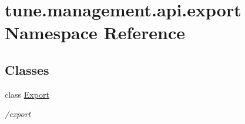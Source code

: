 \hypertarget{namespacetune_1_1management_1_1api_1_1export}{\section{tune.\-management.\-api.\-export Namespace Reference}
\label{namespacetune_1_1management_1_1api_1_1export}
}
\subsection*{Classes}
\begin{DoxyCompactItemize}
\item 
class \hyperlink{classtune_1_1management_1_1api_1_1export_1_1Export}{Export}
\begin{DoxyCompactList}\small\item\em /export \end{DoxyCompactList}\end{DoxyCompactItemize}
